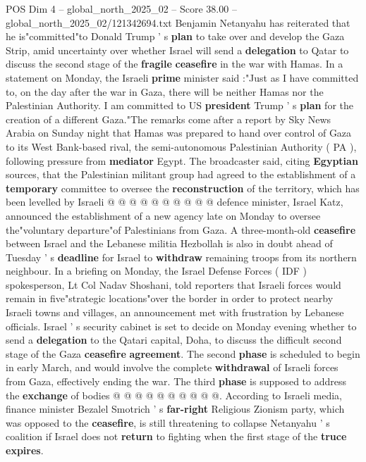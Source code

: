 \begin{textsample}{POS Dim 4 – global\_north\_2025\_02 – Score 38.00 – global\_north\_2025\_02/121342694.txt}  \label{ex:f4_pos_051}
Benjamin Netanyahu has reiterated that he is"committed"to Donald Trump ' s \textbf{plan} to take over and develop the Gaza Strip, amid uncertainty over whether Israel will send a \textbf{delegation} to Qatar to discuss the second stage of the \textbf{fragile} \textbf{ceasefire} in the war with Hamas.
In a statement on Monday, the Israeli \textbf{prime} minister said :"Just as I have committed to, on the day after the war in Gaza, there will be neither Hamas nor the Palestinian Authority.
I am committed to US \textbf{president} Trump ' s \textbf{plan} for the creation of a different Gaza."The remarks come after a report by Sky News Arabia on Sunday night that Hamas was prepared to hand over control of Gaza to its West Bank-based rival, the semi-autonomous Palestinian Authority ( PA ), following pressure from \textbf{mediator} Egypt.
The broadcaster said, citing \textbf{Egyptian} sources, that the Palestinian militant group had agreed to the establishment of a \textbf{temporary} committee to oversee the \textbf{reconstruction} of the territory, which has been levelled by Israeli @ @ @ @ @ @ @ @ @ @ defence minister, Israel Katz, announced the establishment of a new agency late on Monday to oversee the"voluntary departure"of Palestinians from Gaza.
A three-month-old \textbf{ceasefire} between Israel and the Lebanese militia Hezbollah is also in doubt ahead of Tuesday ' s \textbf{deadline} for Israel to \textbf{withdraw} remaining troops from its northern neighbour.
In a briefing on Monday, the Israel Defense Forces ( IDF ) spokesperson, Lt Col Nadav Shoshani, told reporters that Israeli forces would remain in five"strategic locations"over the border in order to protect nearby Israeli towns and villages, an announcement met with frustration by Lebanese officials.
Israel ' s security cabinet is set to decide on Monday evening whether to send a \textbf{delegation} to the Qatari capital, Doha, to discuss the difficult second stage of the Gaza \textbf{ceasefire} \textbf{agreement}.
The second \textbf{phase} is scheduled to begin in early March, and would involve the complete \textbf{withdrawal} of Israeli forces from Gaza, effectively ending the war.
The third \textbf{phase} is supposed to address the \textbf{exchange} of bodies @ @ @ @ @ @ @ @ @ @.
According to Israeli media, finance minister Bezalel Smotrich ' s \textbf{far-right} Religious Zionism party, which was opposed to the \textbf{ceasefire}, is still threatening to collapse Netanyahu ' s coalition if Israel does not \textbf{return} to fighting when the first stage of the \textbf{truce} \textbf{expires}.

\end{textsample}
